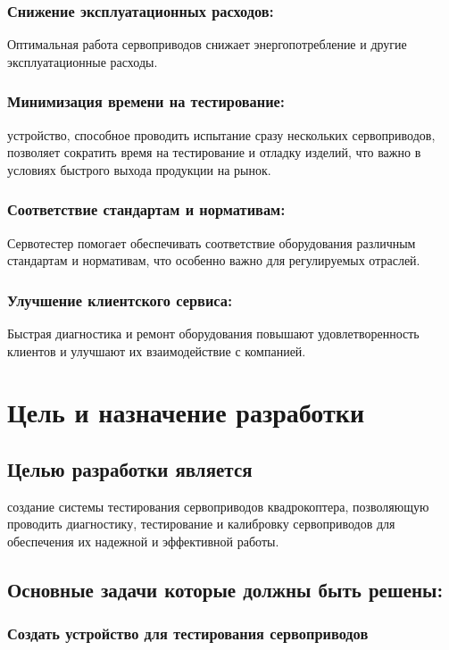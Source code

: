 \documentclass[a4paper]{bsuir-tor}
\begin{document}
  \subsubsection{Снижение эксплуатационных расходов: }
  Оптимальная работа сервоприводов снижает энергопотребление и другие
  эксплуатационные расходы.


  \subsubsection{Минимизация времени на тестирование: }
  устройство, способное проводить испытание сразу нескольких
  сервоприводов, позволяет сократить время на тестирование и отладку
  изделий, что важно в условиях быстрого выхода продукции на рынок.

  \subsubsection{Соответствие стандартам и нормативам: }
  Сервотестер помогает обеспечивать соответствие оборудования
  различным стандартам и нормативам, что особенно важно для
  регулируемых отраслей.

  \subsubsection{Улучшение клиентского сервиса: }
  Быстрая диагностика и ремонт оборудования повышают удовлетворенность
  клиентов и улучшают их взаимодействие с компанией.

  \section{Цель и назначение разработки}
  \subsection{Целью разработки является }
  создание системы тестирования сервоприводов квадрокоптера, позволяющую
  проводить диагностику, тестирование и калибровку сервоприводов для
  обеспечения их надежной и эффективной работы.

  \subsection{Основные задачи которые должны быть решены: }
  
  \subsubsection{Создать устройство для тестирования сервоприводов}
\end{document}
